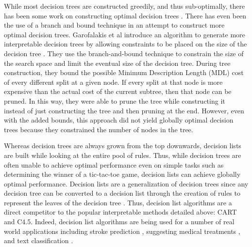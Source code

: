 \documentclass[]{report}
\theoremstyle{definition}
\begin{document}
While most decision trees are constructed greedily, and thus sub-optimally, there has been some work on constructing optimal decision trees \cite{Moret82}.
There has even been the use of a branch and bound technique in an attempt to construct more optimal decision trees.
Garofalakis et al introduce an algorithm to generate more interpretable decision trees by allowing constraints to be placed on the size of the decision tree \cite{GarofalakisHyRaSh00}.
They use the branch-and-bound technique to constrain the size of the search space and limit the eventual size of the decision tree.
During tree construction, they bound the possible Minimum Description Length (MDL) cost of every different split at a given node.
If every split at that node is more expensive than the actual cost of the current subtree, then that node can be pruned.
In this way, they were able to prune the tree while constructing it instead of just constructing the tree and then pruning at the end.
However, even with the added bounds, this approach did not yield globally optimal decision trees because they constrained the number of nodes in the tree.

Whereas decision trees are always grown from the top downwards, decision lists are built while looking at the entire pool of rules.
Thus, while decision trees are often unable to achieve optimal performance even on simple tasks such as determining the winner of a tic-tac-toe game, decision lists can achieve globally optimal performance.
Decision lists are a generalization of decision trees since any decision tree can be converted to a decision list through the creation of rules to represent the leaves of the decision tree \cite{Rivest87}.
Thus, decision list algorithms are a direct competitor to the popular interpretable methods detailed above: CART and C4.5.
Indeed, decision list algorithms are being used for a number of real world applications including stroke prediction \cite{LethamRuMcMa15}, suggesting medical treatments \cite{ZhangLaTsDa2015}, and text classification \cite{LiYa02}.
\end{document}
